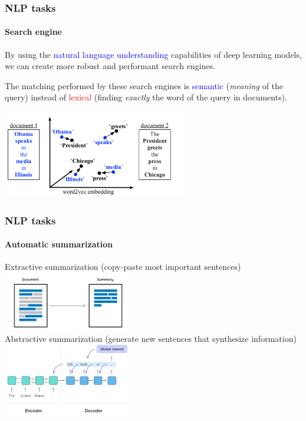 \documentclass[9pt]{beamer}
\begin{document}
\begin{frame}
  \frametitle{NLP tasks}

  \framesubtitle{Search engine}

  By using the \textcolor{blue}{natural language understanding}
  capabilities of deep learning models, we can create more robust and
  performant search engines.

  \bigskip

  The matching performed by these search engines is
  \textcolor{blue}{semantic} (\textit{meaning} of the query) instead
  of \textcolor{red}{lexical} (finding \textit{exactly} the word of
  the query in documents).

  \bigskip

  \begin{center}
    \includegraphics[width = 8cm]{images/word_embeddings_4.png}
  \end{center}

\end{frame}

\begin{frame}
  \frametitle{NLP tasks}

  \framesubtitle{Automatic summarization}

  \begin{center}
    Extractive summarization (copy-paste most important sentences)\\[.3cm]
    \includegraphics[width = 5.5cm]{images/extractive_summarization.png} \\[.5cm]
    Abstractive summarization (generate new sentences that synthesize information)\\[.3cm]
    \includegraphics[width = 5.5cm]{images/abstractive_summarization.png}
  \end{center}
\end{frame}
\end{document}
